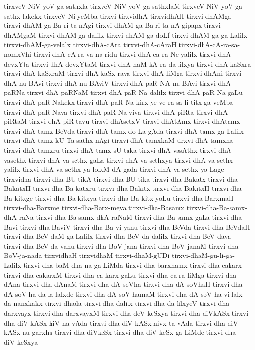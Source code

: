 {tirxveV-NiV-yoV-ga-sathxla
tirxveV-NiV-yoV-ga-sathxlaM
tirxveV-NiV-yoV-ga-sathx-lakekx
tirxveV-Ni-yeMba
tirxvi
tirxvidhA
tirxvidhAH
tirxvi-dhAMga
tirxvi-dhAM-ga-Ba-ri-ta-nAgi
tirxvi-dhAM-ga-Ba-ri-ta-nA-gipapx
tirxvi-dhAMgaM
tirxvi-dhAM-ga-dalilx
tirxvi-dhAM-ga-doLf
tirxvi-dhAM-ga-ga-Lalilx
tirxvi-dhAM-ga-velalx
tirxvi-dhA-cAra
tirxvi-dhA-cAraH
tirxvi-dhA-cA-ra-sa-nomxVhi
tirxvi-dhA-cA-ra-va-na-ridu
tirxvi-dhA-ca-ra-Ne-yalilx
tirxvi-dhA-devxYta
tirxvi-dhA-devxYtaM
tirxvi-dhA-haM-kA-ra-da-lilxya
tirxvi-dhA-kaSxra
tirxvi-dhA-kaSxraM
tirxvi-dhA-kaSx-rava
tirxvi-dhA-liMga
tirxvi-dhAni
tirxvi-dhA-nu-BAvi
tirxvi-dhA-nu-BAviV
tirxvi-dhA-paR-NA-nu-BAvi
tirxvi-dhA-paRNa
tirxvi-dhA-paRNaM
tirxvi-dhA-paR-Na-dalilx
tirxvi-dhA-paR-Na-gaLu
tirxvi-dhA-paR-Nakekx
tirxvi-dhA-paR-Na-kirx-ye-ve-ra-sa-li-titx-ga-veMba
tirxvi-dhA-paR-Nava
tirxvi-dhA-paR-Na-viva
tirxvi-dhA-piRta
tirxvi-dhA-piRtaM
tirxvi-dhA-piR-tavu
tirxvi-dhAsetxV
tirxvi-dhAtAmx
tirxvi-dhAtamx
tirxvi-dhA-tamx-BeVda
tirxvi-dhA-tamx-do-La-gAda
tirxvi-dhA-tamx-ga-Lalilx
tirxvi-dhA-tamx-kU-Ta-sathx-nAgi
tirxvi-dhA-tamxkaM
tirxvi-dhA-tamxna
tirxvi-dhA-tamxru
tirxvi-dhA-tamx-sU-taka
tirxvi-dhA-vasAthx
tirxvi-dhA-vasethx
tirxvi-dhA-va-sethx-gaLa
tirxvi-dhA-va-sethxya
tirxvi-dhA-va-sethx-yalilx
tirxvi-dhA-va-sethx-ya-lolxM-dA-gada
tirxvi-dhA-va-sethx-yo-Lage
tirxvidha
tirxvi-dha-BU-tikA
tirxvi-dha-BU-tika
tirxvi-dha-Bakatx
tirxvi-dha-BakatxH
tirxvi-dha-Ba-katxru
tirxvi-dha-Bakitx
tirxvi-dha-BakitxH
tirxvi-dha-Ba-kitxge
tirxvi-dha-Ba-kitxya
tirxvi-dha-Ba-kitx-yoLu
tirxvi-dha-BarxmaH
tirxvi-dha-Barxme
tirxvi-dha-Barx-meya
tirxvi-dha-Basamx
tirxvi-dha-Ba-samx-dhA-raNa
tirxvi-dha-Ba-samx-dhA-raNaM
tirxvi-dha-Ba-samx-gaLa
tirxvi-dha-Bavi
tirxvi-dha-BaviV
tirxvi-dha-Ba-vi-yanu
tirxvi-dha-BeVda
tirxvi-dha-BeVdaH
tirxvi-dha-BeV-daM-ga-Lalilx
tirxvi-dha-BeV-da-dalilx
tirxvi-dha-BeV-dava
tirxvi-dha-BeV-da-vanu
tirxvi-dha-BoV-jana
tirxvi-dha-BoV-janaM
tirxvi-dha-BoV-ja-nada
tirxvidhaH
tirxvidhaM
tirxvi-dhaM-gUDi
tirxvi-dhaM-gu-li-ga-Lalilx
tirxvi-dha-baM-dha-na-ga-LiMda
tirxvi-dha-barxhamx
tirxvi-dha-cakarx
tirxvi-dha-cakarxM
tirxvi-dha-ca-karx-gaLu
tirxvi-dha-ca-ra-liMga
tirxvi-dha-dAna
tirxvi-dha-dAnaM
tirxvi-dha-dA-soVha
tirxvi-dha-dA-soVhaH
tirxvi-dha-dA-soV-ha-da-la-lalxde
tirxvi-dha-dA-soV-hamaM
tirxvi-dha-dA-soV-ha-vi-lalx-da-nanxkakx
tirxvi-dhada
tirxvi-dha-dalilx
tirxvi-dha-da-lilxyeV
tirxvi-dha-darxvayx
tirxvi-dha-darxvayxM
tirxvi-dha-deV-keSxya
tirxvi-dha-diVkASx
tirxvi-dha-diV-kASx-hiV-na-vAda
tirxvi-dha-diV-kASx-nivx-ta-vAda
tirxvi-dha-diV-kASx-nu-garxha
tirxvi-dha-diVkeSx
tirxvi-dha-diV-keSx-ga-LiMde
tirxvi-dha-diV-keSxya
}
